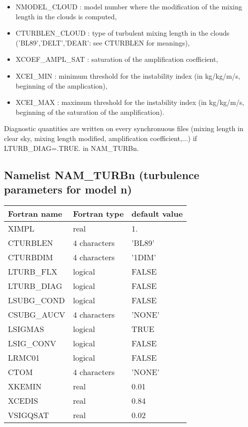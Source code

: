 \begin{itemize}
\item NMODEL\_CLOUD :
model number where the modification of the mixing length in the clouds is
computed,
\item CTURBLEN\_CLOUD :
type of turbulent mixing length in the clouds
 ('BL89','DELT','DEAR': see CTURBLEN for meanings),
\item XCOEF\_AMPL\_SAT :
saturation of the amplification coefficient,
\item XCEI\_MIN :
minimum threshold for the instability index (in kg/kg/m/s,
 beginning of the amplication),
\item XCEI\_MAX :
maximum threshold for the instability index (in kg/kg/m/s,
 beginning of the saturation of the amplification).
\end{itemize}
Diagnostic quantities are written on every synchronuous files 
(mixing length in clear sky, mixing length modified, amplification coefficient,...) if LTURB\_DIAG=.TRUE. in NAM\_TURBn.
\subsection{Namelist NAM\_TURBn (turbulence parameters for model n)}

\begin{center}
\begin{tabular} {|l|l|l|}
\hline
Fortran name & Fortran type & default value \\
\hline
XIMPL       &  real          & 1.     \\
CTURBLEN    &  4 characters  & 'BL89'   \\
CTURBDIM    &  4 characters  & '1DIM'   \\
LTURB\_FLX  &  logical       & FALSE  \\
LTURB\_DIAG &  logical       & FALSE  \\
LSUBG\_COND &  logical       & FALSE  \\
CSUBG\_AUCV &  4 characters  & 'NONE' \\
LSIGMAS     &  logical       & TRUE   \\
LSIG\_CONV  &  logical       & FALSE   \\
LRMC01      &  logical       & FALSE  \\
CTOM        &  4 characters  & 'NONE'   \\
XKEMIN      &  real          & 0.01 \\
XCEDIS      &  real          & 0.84 \\
VSIGQSAT    & real           & 0.02 \\
\hline
\end{tabular}
\end{center}

